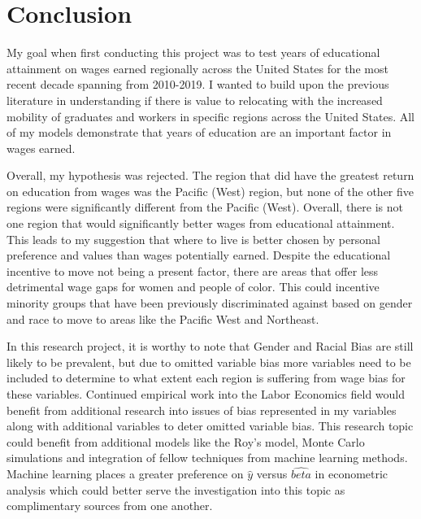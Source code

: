 \documentclass[12pt, English]{article}
\begin{document}
\section{Conclusion}
My goal when first conducting this project was to test years of educational attainment on wages earned regionally across the United States for the most recent decade spanning from 2010-2019. I wanted to build upon the previous literature in understanding if there is value to relocating with the increased mobility of graduates and workers in specific regions across the United States. All of my models demonstrate that years of education are an important factor in wages earned.

Overall, my hypothesis was rejected. The region that did have the greatest return on education from wages was the Pacific (West) region, but none of the other five regions were significantly different from  the Pacific (West). Overall, there is not one region that would significantly better wages from educational attainment. This leads to my suggestion that where to live is better chosen by personal preference and values than wages potentially earned. Despite the educational incentive to move not being a present factor, there are areas that offer less detrimental wage gaps for women and people of color. This could incentive minority groups that have been previously discriminated against based on gender and race to move to areas like the Pacific West and Northeast. 

In this research project, it is worthy to note that Gender and Racial Bias are still likely to be prevalent, but due to omitted variable bias more variables need to be included to determine to what extent each region is suffering from wage bias for these variables. Continued empirical work into the Labor Economics field would benefit from additional research into issues of bias represented in my variables along with additional variables to deter omitted variable bias. This research topic could benefit from additional models like the Roy's model, Monte Carlo simulations and integration of fellow techniques from machine learning methods. Machine learning places a greater preference on \begin{math} \hat{y} \end{math} versus \begin{math} \hat{beta} \end{math} in econometric analysis which could better serve the investigation into this topic as complimentary sources from one another. 
\end{document}

